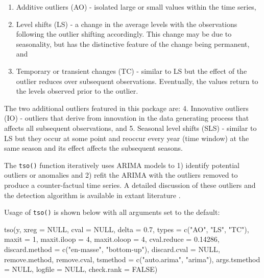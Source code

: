 \documentclass[12pt]{article}
\providecommand{\tightlist}{%
  \setlength{\itemsep}{0pt}\setlength{\parskip}{0pt}}
\newenvironment{Shaded}{\begin{snugshade}}{\end{snugshade}}
\newcommand{\AttributeTok}[1]{\textcolor[rgb]{0.77,0.63,0.00}{#1}}
\newcommand{\ConstantTok}[1]{\textcolor[rgb]{0.00,0.00,0.00}{#1}}
\newcommand{\DecValTok}[1]{\textcolor[rgb]{0.00,0.00,0.81}{#1}}
\newcommand{\FloatTok}[1]{\textcolor[rgb]{0.00,0.00,0.81}{#1}}
\newcommand{\FunctionTok}[1]{\textcolor[rgb]{0.00,0.00,0.00}{#1}}
\newcommand{\NormalTok}[1]{#1}
\newcommand{\StringTok}[1]{\textcolor[rgb]{0.31,0.60,0.02}{#1}}
\begin{document}
\begin{enumerate}
\def\labelenumi{\arabic{enumi}.}
\tightlist
\item
  Additive outliers (AO) - isolated large or small values within the
  time series,
\item
  Level shifts (LS) - a change in the average levels with the
  observations following the outlier shifting accordingly. This change
  may be due to seasonality, but has the distinctive feature of the
  change being permanent, and
\item
  Temporary or transient changes (TC) - similar to LS but the effect of
  the outlier reduces over subsequent observations. Eventually, the
  values return to the levels observed prior to the outlier.
\end{enumerate}

The two additional outliers featured in this package are: 4. Innovative
outliers (IO) - outliers that derive from innovation in the data
generating process that affects all subsequent observations, and 5.
Seasonal level shifts (SLS) - similar to LS but they occur at some point
and reoccur every year (time window) at the same season and its effect
affects the subsequent seasons.

The \texttt{tso()} function iteratively uses ARIMA models to 1) identify
potential outliers or anomalies and 2) refit the ARIMA with the outliers
removed to produce a counter-factual time series. A detailed discussion
of these outliers and the detection algorithm is available in extant
literature
\citep{chen1993joint, tsoutliers, asghar2017analysis, burman1988outliers}.

Usage of \texttt{tso()} is shown below with all arguments set to the
default:

\begin{Shaded}
\begin{Highlighting}[]
\FunctionTok{tso}\NormalTok{(y, }\AttributeTok{xreg =} \ConstantTok{NULL}\NormalTok{, }\AttributeTok{cval =} \ConstantTok{NULL}\NormalTok{, }\AttributeTok{delta =} \FloatTok{0.7}\NormalTok{, }\AttributeTok{types =} \FunctionTok{c}\NormalTok{(}\StringTok{"AO"}\NormalTok{, }\StringTok{"LS"}\NormalTok{, }\StringTok{"TC"}\NormalTok{), }
    \AttributeTok{maxit =} \DecValTok{1}\NormalTok{, }\AttributeTok{maxit.iloop =} \DecValTok{4}\NormalTok{, }\AttributeTok{maxit.oloop =} \DecValTok{4}\NormalTok{, }\AttributeTok{cval.reduce =} \FloatTok{0.14286}\NormalTok{,    }
    \AttributeTok{discard.method =} \FunctionTok{c}\NormalTok{(}\StringTok{"en{-}masse"}\NormalTok{, }\StringTok{"bottom{-}up"}\NormalTok{), }\AttributeTok{discard.cval =} \ConstantTok{NULL}\NormalTok{, }
\NormalTok{    remove.method, remove.cval, }\AttributeTok{tsmethod =} \FunctionTok{c}\NormalTok{(}\StringTok{"auto.arima"}\NormalTok{, }\StringTok{"arima"}\NormalTok{),   }
    \AttributeTok{args.tsmethod =} \ConstantTok{NULL}\NormalTok{, }\AttributeTok{logfile =} \ConstantTok{NULL}\NormalTok{, }\AttributeTok{check.rank =} \ConstantTok{FALSE}\NormalTok{)}
\end{Highlighting}
\end{Shaded}
\end{document}
